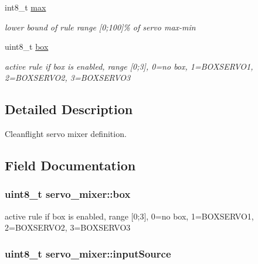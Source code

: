 \begin{DoxyCompactItemize}
int8\+\_\+t \hyperlink{structservo__mixer_ac8f02f090be0f5f944e2b8fb21659926}{max}
\begin{DoxyCompactList}\small\item\em lower bound of rule range \mbox{[}0;100\mbox{]}\% of servo max-\/min \end{DoxyCompactList}\item 
uint8\+\_\+t \hyperlink{structservo__mixer_a4e1ff1934af3795df7d769672c6a0c2d}{box}
\begin{DoxyCompactList}\small\item\em active rule if box is enabled, range \mbox{[}0;3\mbox{]}, 0=no box, 1=B\+O\+X\+S\+E\+R\+V\+O1, 2=B\+O\+X\+S\+E\+R\+V\+O2, 3=B\+O\+X\+S\+E\+R\+V\+O3 \end{DoxyCompactList}\end{DoxyCompactItemize}


\subsection{Detailed Description}
Cleanflight servo mixer definition. 

\subsection{Field Documentation}
\hypertarget{structservo__mixer_a4e1ff1934af3795df7d769672c6a0c2d}{
\subsubsection[{box}]{\setlength{\rightskip}{0pt plus 5cm}uint8\+\_\+t servo\+\_\+mixer\+::box}}\label{structservo__mixer_a4e1ff1934af3795df7d769672c6a0c2d}


active rule if box is enabled, range \mbox{[}0;3\mbox{]}, 0=no box, 1=B\+O\+X\+S\+E\+R\+V\+O1, 2=B\+O\+X\+S\+E\+R\+V\+O2, 3=B\+O\+X\+S\+E\+R\+V\+O3 

\hypertarget{structservo__mixer_a40f47a678b24b3a2e045f7a3cbd5d7a0}{
\subsubsection[{input\+Source}]{\setlength{\rightskip}{0pt plus 5cm}uint8\+\_\+t servo\+\_\+mixer\+::input\+Source}}\label{structservo__mixer_a40f47a678b24b3a2e045f7a3cbd5d7a0}


